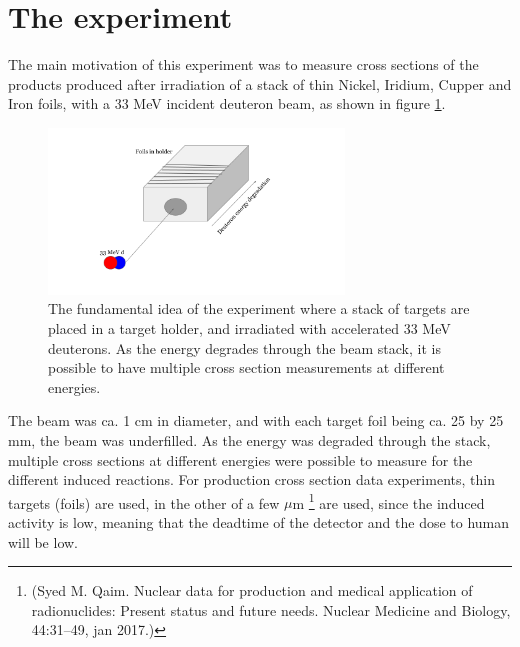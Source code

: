 \documentclass[a4paper,11pt,twoside]{book}
\begin{document}
\section{The experiment}
The main motivation of this experiment was to measure cross sections of the products produced after irradiation of a stack of thin Nickel, Iridium, Cupper and Iron foils, with a 33 MeV incident deuteron beam, as shown in figure \ref{fig:experiment_illustration}. 
\begin{figure}
    \centering
    \includegraphics[width=0.7\textwidth]{Experiment/Illustration_beamOnTarget.png}
    \caption{The fundamental idea of the experiment where a stack of targets are placed in a target holder, and irradiated with accelerated 33 MeV deuterons. As the energy degrades through the beam stack, it is possible to have multiple cross section measurements at different energies.}
    \label{fig:experiment_illustration}
\end{figure}

The beam was ca. 1 cm in diameter, and with each target foil being ca. 25 by 25 mm, the beam was underfilled. As the energy was degraded through the stack, multiple cross sections at different energies were possible to measure for the different induced reactions. For production cross section data experiments, thin targets (foils) are used, in the other of a few $\mu$m \footnote{(Syed M. Qaim. Nuclear data for production and medical application of radionuclides:
Present status and future needs. Nuclear Medicine and Biology, 44:31–49, jan 2017.)} are used, since the induced activity is low, meaning that the deadtime of the detector and the dose to human will be low.  

\noindent 

\end{document}
